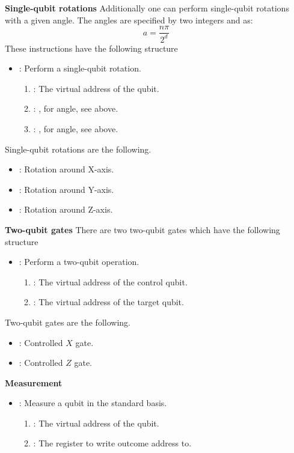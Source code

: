 \textbf{Single-qubit rotations}
Additionally one can perform single-qubit rotations with a given angle.
The angles  are specified by two integers  and  as:
\begin{equation}
  a = \frac{n\pi}{2^d}
\end{equation}
These instructions have the following structure
\begin{itemize}
  \item {}: Perform a single-qubit rotation.
        \begin{enumerate}
          \item \REGISTER: The virtual address of the qubit.
          \item \IMMEDIATE: , for angle, see above.
          \item \IMMEDIATE: , for angle, see above.
        \end{enumerate}
\end{itemize}

Single-qubit rotations are the following.
\begin{itemize}
  \item {}: Rotation around X-axis.
  \item {}: Rotation around Y-axis.
  \item {}: Rotation around Z-axis.
\end{itemize}

\textbf{Two-qubit gates}
There are two two-qubit gates which have the following structure
\begin{itemize}
  \item {}: Perform a two-qubit operation.
        \begin{enumerate}
          \item \REGISTER: The virtual address of the control qubit.
          \item \REGISTER: The virtual address of the target qubit.
        \end{enumerate}
\end{itemize}

Two-qubit gates are the following.
\begin{itemize}
  \item {}: Controlled $X$ gate.
  \item {}: Controlled $Z$ gate.
\end{itemize}

\textbf{Measurement}
\begin{itemize}
  \item {}: Measure a qubit in the standard basis.
        \begin{enumerate}
          \item \REGISTER: The virtual address of the qubit.
          \item \REGISTER: The register to write outcome address to.
        \end{enumerate}
\end{itemize}

